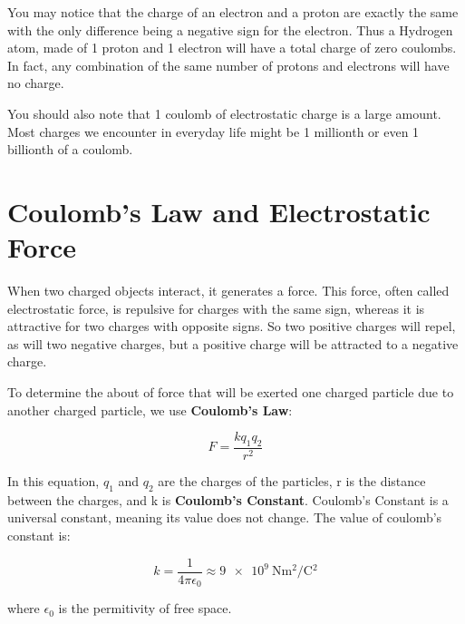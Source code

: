 	You may notice that the charge of an electron and a proton are exactly the same with the only difference being a negative sign for the electron.  Thus a Hydrogen atom, made of 1 proton and 1 electron will have a total charge of zero coulombs.  In fact, any combination of the same number of protons and electrons will have no charge. 
	
	You should also note that 1 coulomb of electrostatic charge is a large amount.  Most charges we encounter in everyday life might be 1 millionth or even 1 billionth of a coulomb. 
	
	

	\section{Coulomb's Law and Electrostatic Force}  

When two charged objects interact, it generates a force.  This force, often called electrostatic force, is repulsive for charges with the same sign, whereas it is attractive for two charges with opposite signs.  So two positive charges will repel, as will two negative charges, but a positive charge will be attracted to a negative charge.  


To determine the about of force that will be exerted one charged particle due to another charged particle, we use \textbf{Coulomb's Law}:
\begin{mdframed}[backgroundcolor=orange!20!white]

	\begin{equation}
	F = \frac{kq_1q_2}{r^2}
	\label{equation:coulombslaw}
	\end{equation}
\end{mdframed}	
	In this equation, $q_1$ and $q_2$ are the charges of the particles, r is the distance between the charges, and k is \textbf{Coulomb's Constant}.  Coulomb's Constant is a universal constant, meaning its value does not change.  The value of coulomb's constant is: 
	
		\begin{mdframed}[backgroundcolor=green!20!white]
		\begin{equation*}
			k  = \frac{1}{4\pi\epsilon_0}\approx \SI[per-mode = symbol]{9e9}{\N\m^2\per\coulomb^2}
			\label{equation:coulombsconstant}
		\end{equation*}
	\end{mdframed}	
	where $\epsilon_0$ is the permitivity of free space.
	

